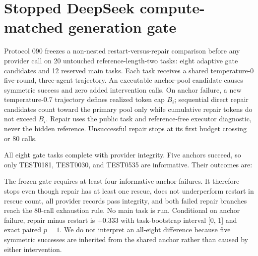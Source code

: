 \section{Stopped DeepSeek compute-matched generation gate}

Protocol 090 freezes a non-nested restart-versus-repair comparison before any provider call on 20 untouched reference-length-two tasks: eight adaptive gate candidates and 12 reserved main tasks. Each task receives a shared temperature-0 five-round, three-agent trajectory. An executable anchor-pool candidate causes symmetric success and zero added intervention calls. On anchor failure, a new temperature-0.7 trajectory defines realized token cap \(B_i\); sequential direct repair candidates count toward the primary pool only while cumulative repair tokens do not exceed \(B_i\). Repair uses the public task and reference-free executor diagnostic, never the hidden reference. Unsuccessful repair stops at its first budget crossing or 80 calls.

All eight gate tasks complete with provider integrity. Five anchors succeed, so only TEST0181, TEST0030, and TEST0535 are informative. Their outcomes are:

\begin{center}
\end{center}

The frozen gate requires at least four informative anchor failures. It therefore stops even though repair has at least one rescue, does not underperform restart in rescue count, all provider records pass integrity, and both failed repair branches reach the 80-call exhaustion rule. No main task is run. Conditional on anchor failure, repair minus restart is +0.333 with task-bootstrap interval [0, 1] and exact paired \(p=1\). We do not interpret an all-eight difference because five symmetric successes are inherited from the shared anchor rather than caused by either intervention.

